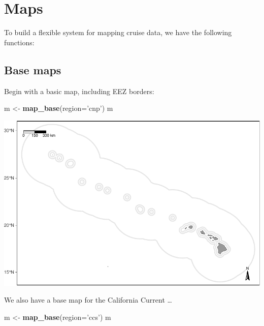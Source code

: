 \documentclass[
]{book}
\newenvironment{Shaded}{\begin{snugshade}}{\end{snugshade}}
\newcommand{\DataTypeTok}[1]{\textcolor[rgb]{0.13,0.29,0.53}{#1}}
\newcommand{\KeywordTok}[1]{\textcolor[rgb]{0.13,0.29,0.53}{\textbf{#1}}}
\newcommand{\NormalTok}[1]{#1}
\newcommand{\StringTok}[1]{\textcolor[rgb]{0.31,0.60,0.02}{#1}}
\begin{document}
\hypertarget{maps}{%
\chapter{Maps}\label{maps}}

To build a flexible system for mapping cruise data, we have the following functions:

\hypertarget{base-maps}{%
\section*{Base maps}\label{base-maps}}

Begin with a basic map, including EEZ borders:

\begin{Shaded}
\begin{Highlighting}[]
\NormalTok{m <-}\StringTok{ }\KeywordTok{map_base}\NormalTok{(}\DataTypeTok{region=}\StringTok{'cnp'}\NormalTok{)}
\NormalTok{m}
\end{Highlighting}
\end{Shaded}

\includegraphics{figures/unnamed-chunk-54-1.pdf}

We also have a base map for the California Current \ldots{}

\begin{Shaded}
\begin{Highlighting}[]
\NormalTok{m <-}\StringTok{ }\KeywordTok{map_base}\NormalTok{(}\DataTypeTok{region=}\StringTok{'ccs'}\NormalTok{)}
\NormalTok{m}
\end{Highlighting}
\end{Shaded}
\end{document}
